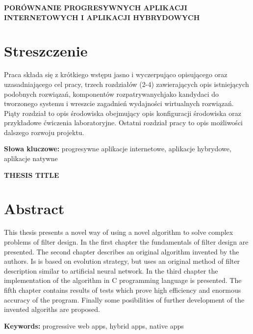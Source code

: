 \newpage
\begin{center}
\large \bf
PORÓWNANIE PROGRESYWNYCH APLIKACJI INTERNETOWYCH I APLIKACJI HYBRYDOWYCH
\end{center}

\section*{Streszczenie}
Praca składa się z krótkiego wstępu jasno i
wyczerpująco opisującego oraz uzasadniającego cel pracy, trzech rozdziałów (2-4)
zawierających opis istniejących podobnych
rozwiązań, komponentów rozpatrywanychjako kandydaci do
tworzonego systemu i wreszcie zagadnień wydajności wirtualnych
rozwiązań. Piąty rozdział to opis  środowiska obejmujący opis konfiguracji
środowiska oraz przykładowe ćwiczenia laboratoryjne. Ostatni
rozdział pracy to opis możliwości dalszego
rozwoju projektu. 

\bigskip
{\noindent\bf Słowa kluczowe:} progresywne aplikacje internetowe, aplikacje hybrydowe, aplikacje natywne

\vskip 2cm


\begin{center}
\large \bf
THESIS TITLE
\end{center}

\section*{Abstract}
This thesis presents a novel way of using a novel algorithm to solve complex
problems of filter design. In the first chapter the fundamentals of filter design
are presented. The second chapter describes an original algorithm invented by the
authors. Is is based on evolution strategy, but uses an original method of filter
description similar to artificial neural network. In the third chapter the implementation
of the algorithm in C programming language is presented. The fifth chapter contains results
of tests which prove high efficiency and enormous accuracy of the program. Finally some
posibilities of further development of the invented algoriths are proposed.

\bigskip
{\noindent\bf Keywords:} progressive web apps, hybrid apps, native apps

\vfill